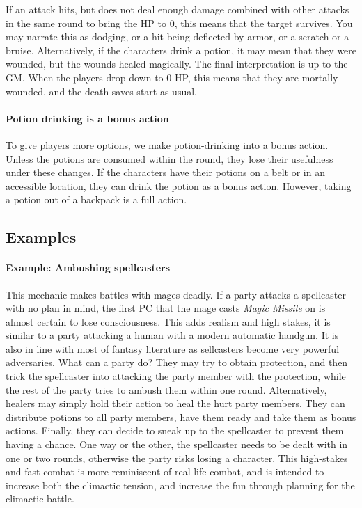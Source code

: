 \documentclass[twocolumn]{dndbook}
\begin{document}
If an attack hits, but does not deal enough damage combined with other attacks in the same round to bring the HP to 0, this means that the target survives.
You may narrate this as dodging, or a hit being deflected by armor, or a scratch or a bruise.
Alternatively, if the characters drink a potion, it may mean that they were wounded, but the wounds healed magically.
The final interpretation is up to the GM.
When the players drop down to 0 HP, this means that they are mortally wounded, and the death saves start as usual.

\paragraph*{Potion drinking is a bonus action} To give players more options, we make potion-drinking into a bonus action.
Unless the potions are consumed within the round, they lose their usefulness under these changes.
If the characters have their potions on a belt or in an accessible location, they can drink the potion as a bonus action.
However, taking a potion out of a backpack is a full action.\par

\subsection{Examples}

\paragraph*{Example: Ambushing spellcasters} This mechanic makes battles with mages deadly.
If a party attacks a spellcaster with no plan in mind, the first PC that the mage casts \emph{Magic Missile} on is almost certain to lose consciousness.
This adds realism and high stakes, it is similar to a party attacking a human with a modern automatic handgun.
It is also in line with most of fantasy literature as sellcasters become very powerful adversaries.
What can a party do? They may try to obtain protection, and then trick the spellcaster into attacking the party member with the protection, while the rest of the party tries to ambush them within one round.
Alternatively, healers may simply hold their action to heal the hurt party members.
They can distribute potions to all party members, have them ready and take them as bonus actions.
Finally, they can decide to sneak up to the spellcaster to prevent them having a chance.
One way or the other, the spellcaster needs to be dealt with in one or two rounds, otherwise the party risks losing a character.
This high-stakes and fast combat is more reminiscent of real-life combat, and is intended to increase both the climactic tension, and increase the fun through planning for the climactic battle.\par
\end{document}
